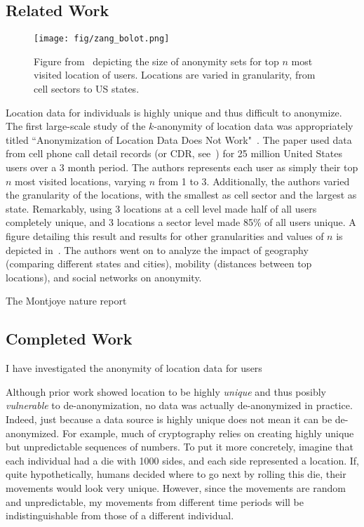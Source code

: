 



\subsection{Related Work}
\begin{figure}[t]
  \centering
  \texttt{[image: fig/zang\_bolot.png]}
  \caption{Figure from~\cite{Zang:2011hk} depicting the size of anonymity sets for top $n$ most visited location of users.
           Locations are varied in granularity, from cell sectors to US states.}
  \label{fig:zang_bolot}
\end{figure}

Location data for individuals is highly unique and thus difficult to anonymize.
The first large-scale study of the $k$-anonymity of location data was appropriately titled ``Anonymization of Location Data Does Not Work"~\cite{Zang:2011hk}.
The paper used data from cell phone call detail records (or CDR, see~) for 25 million United States users over a 3 month period.
The authors represents each user as simply their top $n$ most visited locations, varying $n$ from 1 to 3.
Additionally, the authors varied the granularity of the locations, with the smallest as cell sector and the largest as state.
Remarkably, using 3 locations at a cell level made half of all users completely unique, and 3 locations a sector level made 85\% of all users unique.
A figure detailing this result and results for other granularities and values of $n$ is depicted in~.
The authors went on to analyze the impact of geography (comparing different states and cities), mobility (distances between top locations), and social networks on anonymity.


The Montjoye nature report


\subsection{Completed Work}
I have investigated the anonymity of location data for users

Although prior work showed location to be highly \emph{unique} and thus posibly \emph{vulnerable} to de-anonymization, no data was actually de-anonymized in practice.
Indeed, just because a data source is highly unique does not mean it can be de-anonymized.
For example, much of cryptography relies on creating highly unique but unpredictable sequences of numbers.
To put it more concretely, imagine that each individual had a die with 1000 sides, and each side represented a location.
If, quite hypothetically, humans decided where to go next by rolling this die, their movements would look very unique.
However, since the movements are random and unpredictable, my movements from different time periods will be indistinguishable from those of a different individual.

